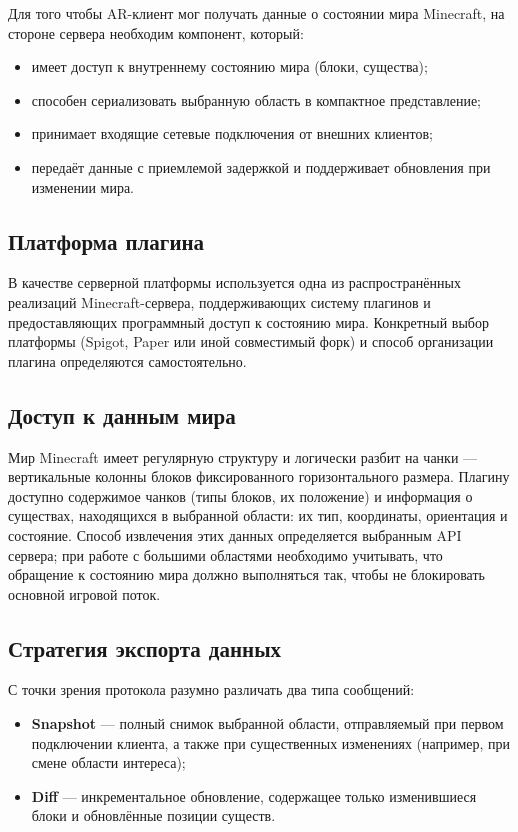 \documentclass[a4paper,12pt]{article}
\begin{document}
Для того чтобы AR-клиент мог получать данные о состоянии мира Minecraft, на стороне сервера необходим компонент, который:

\begin{itemize}
    \item имеет доступ к внутреннему состоянию мира (блоки, существа);
    \item способен сериализовать выбранную область в компактное представление;
    \item принимает входящие сетевые подключения от внешних клиентов;
    \item передаёт данные с приемлемой задержкой и поддерживает обновления при изменении мира.
\end{itemize}

\subsection*{Платформа плагина}

В качестве серверной платформы используется одна из распространённых реализаций Minecraft-сервера, поддерживающих систему плагинов и предоставляющих программный доступ к состоянию мира. Конкретный выбор платформы (Spigot, Paper или иной совместимый форк) и способ организации плагина определяются самостоятельно.

\subsection*{Доступ к данным мира}

Мир Minecraft имеет регулярную структуру и логически разбит на чанки --- вертикальные колонны блоков фиксированного горизонтального размера. Плагину доступно содержимое чанков (типы блоков, их положение) и информация о существах, находящихся в выбранной области: их тип, координаты, ориентация и состояние. Способ извлечения этих данных определяется выбранным API сервера; при работе с большими областями необходимо учитывать, что обращение к состоянию мира должно выполняться так, чтобы не блокировать основной игровой поток.

\subsection*{Стратегия экспорта данных}

С точки зрения протокола разумно различать два типа сообщений:

\begin{itemize}
    \item \textbf{Snapshot} --- полный снимок выбранной области, отправляемый при первом подключении клиента, а также при существенных изменениях (например, при смене области интереса);
    \item \textbf{Diff} --- инкрементальное обновление, содержащее только изменившиеся блоки и обновлённые позиции существ.
\end{itemize}
\end{document}
